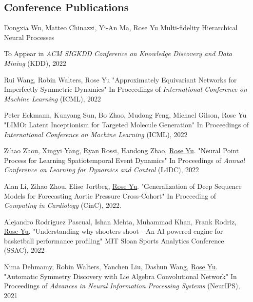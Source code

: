 \documentclass[margin,line]{res}
\begin{document}
\begin{resume}
\section{\sc Conference Publications}

\begin{enumerate}[label={[C\arabic*]}]

\item 
Dongxia Wu, Matteo Chinazzi, Yi-An Ma, Rose Yu
Multi-fidelity Hierarchical Neural Processes

To Appear in \textit{ACM SIGKDD Conference on Knowledge Discovery and Data Mining} (KDD), 2022

\item 
Rui Wang, Robin Walters, Rose Yu
"Approximately Equivariant Networks for Imperfectly Symmetric Dynamics"
In Proceedings of \textit{International Conference on Machine Learning} (ICML), 2022

\item 
Peter Eckmann, Kunyang Sun, Bo Zhao, Mudong Feng, Michael Gilson, Rose Yu
"LIMO: Latent Inceptionism for Targeted Molecule Generation"  In Proceedings of \textit{International Conference on Machine Learning} (ICML), 2022
 

\item 
 Zihao Zhou, Xingyi Yang, Ryan Rossi, Handong Zhao, \underline{Rose Yu}.
"Neural Point Process for Learning Spatiotemporal Event Dynamics"  In Proceedings of  \textit{Annual Conference on Learning for Dynamics and Control}
 (L4DC), 2022
 
 
 \item 
 Alan Li, Zihao Zhou, Elise Jortbeg, \underline{Rose Yu}. "Generalization of Deep Sequence Models for Forecasting Aortic Pressure Cross-Cohort" In  Proceeding of  \textit{Computing in Cardiology} (CinC), 2022.


 
 
 \item Alejandro Rodriguez Pascual, Ishan Mehta, 
Muhammad Khan, Frank Rodriz, \underline{Rose Yu}. "Understanding why shooters shoot - An AI-powered engine for basketball performance profiling" MIT Sloan Sports Analytics Conference (SSAC), 2022 
 
\item 
Nima Dehmamy, Robin Walters, Yanchen Liu, Dashun Wang, \underline{Rose Yu}. "Automatic Symmetry Discovery with Lie Algebra Convolutional Network"
In Proceedings of \textit{Advances in Neural Information Processing Systems} (NeurIPS), 2021


\end{enumerate}
\end{resume}
\end{document}
